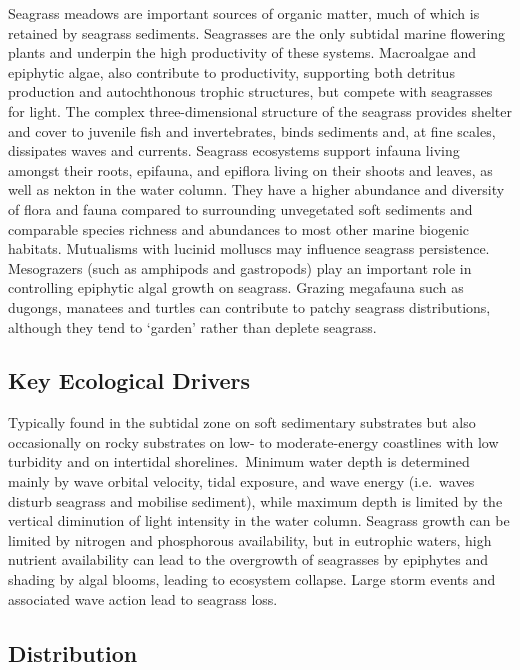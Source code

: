 \documentclass[
  letterpaper,
  DIV=11,
  numbers=noendperiod]{scrartcl}
\begin{document}
Seagrass meadows are important sources of organic matter, much of which
is retained by seagrass sediments. Seagrasses are the only subtidal
marine flowering plants and underpin the high productivity of these
systems. Macroalgae and epiphytic algae, also contribute to
productivity, supporting both detritus production and autochthonous
trophic structures, but compete with seagrasses for light. The complex
three-dimensional structure of the seagrass provides shelter and cover
to juvenile fish and invertebrates, binds sediments and, at fine scales,
dissipates waves and currents. Seagrass ecosystems support infauna
living amongst their roots, epifauna, and epiflora living on their
shoots and leaves, as well as nekton in the water column. They have a
higher abundance and diversity of flora and fauna compared to
surrounding unvegetated soft sediments and comparable species richness
and abundances to most other marine biogenic habitats. Mutualisms with
lucinid molluscs may influence seagrass persistence. Mesograzers (such
as amphipods and gastropods) play an important role in controlling
epiphytic algal growth on seagrass. Grazing megafauna such as dugongs,
manatees and turtles can contribute to patchy seagrass distributions,
although they tend to `garden' rather than deplete seagrass.

\subsection{Key Ecological Drivers}\label{key-ecological-drivers-25}

Typically found in the subtidal zone on soft sedimentary substrates but
also occasionally on rocky substrates on low- to moderate-energy
coastlines with low turbidity and on intertidal shorelines.~Minimum
water depth is determined mainly by wave orbital velocity, tidal
exposure, and wave energy (i.e.~waves disturb seagrass and mobilise
sediment), while maximum depth is limited by the vertical diminution of
light intensity in the water column. Seagrass growth can be limited by
nitrogen and phosphorous availability, but in eutrophic waters, high
nutrient availability can lead to the overgrowth of seagrasses by
epiphytes and shading by algal blooms, leading to ecosystem collapse.
Large storm events and associated wave action lead to seagrass loss.

\subsection{Distribution}\label{distribution-25}
\end{document}
